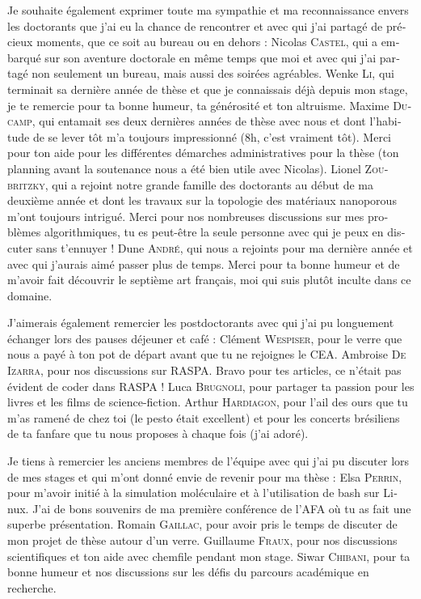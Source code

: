 \begin{otherlanguage}{french}
Je souhaite également exprimer toute ma sympathie et ma reconnaissance envers les doctorants que j'ai eu la chance de rencontrer et avec qui j'ai partagé de précieux moments, que ce soit au bureau ou en dehors :
Nicolas \textsc{Castel}, qui a embarqué sur son aventure doctorale en même temps que moi et avec qui j'ai partagé non seulement un bureau, mais aussi des soirées agréables.
Wenke \textsc{Li}, qui terminait sa dernière année de thèse et que je connaissais déjà depuis mon stage, je te remercie pour ta bonne humeur, ta générosité et ton altruisme.
Maxime \textsc{Ducamp}, qui entamait ses deux dernières années de thèse avec nous et dont l'habitude de se lever tôt m'a toujours impressionné (8h, c'est vraiment tôt). Merci pour ton aide pour les différentes démarches administratives pour la thèse (ton planning avant la soutenance nous a été bien utile avec Nicolas).
Lionel \textsc{Zoubritzky}, qui a rejoint notre grande famille des doctorants au début de ma deuxième année et dont les travaux sur la topologie des matériaux nanoporous m'ont toujours intrigué. Merci pour nos nombreuses discussions sur mes problèmes algorithmiques, tu es peut-être la seule personne avec qui je peux en discuter sans t'ennuyer !
Dune \textsc{André}, qui nous a rejoints pour ma dernière année et avec qui j'aurais aimé passer plus de temps. Merci pour ta bonne humeur et de m'avoir fait découvrir le septième art français, moi qui suis plutôt inculte dans ce domaine.

J'aimerais également remercier les postdoctorants avec qui j'ai pu longuement échanger lors des pauses déjeuner et café :
Clément \textsc{Wespiser}, pour le verre que nous a payé à ton pot de départ avant que tu ne rejoignes le CEA.
Ambroise \textsc{De Izarra}, pour nos discussions sur RASPA. Bravo pour tes articles, ce n'était pas évident de coder dans RASPA !
Luca \textsc{Brugnoli}, pour partager ta passion pour les livres et les films de science-fiction. 
Arthur \textsc{Hardiagon}, pour l'ail des ours que tu m'as ramené de chez toi (le pesto était excellent) et pour les concerts brésiliens de ta fanfare que tu nous proposes à chaque fois (j'ai adoré).

Je tiens à remercier les anciens membres de l'équipe avec qui j'ai pu discuter lors de mes stages et qui m'ont donné envie de revenir pour ma thèse :
Elsa \textsc{Perrin}, pour m'avoir initié à la simulation moléculaire et à l'utilisation de {\normalfont bash} sur {\normalfont Linux}. J'ai de bons souvenirs de ma première conférence de l'{\normalfont AFA} où tu as fait une superbe présentation.
Romain \textsc{Gaillac}, pour avoir pris le temps de discuter de mon projet de thèse autour d'un verre.
Guillaume \textsc{Fraux}, pour nos discussions scientifiques et ton aide avec {\normalfont chemfile} pendant mon stage.
Siwar \textsc{Chibani}, pour ta bonne humeur et nos discussions sur les défis du parcours académique en recherche.


\end{otherlanguage}
